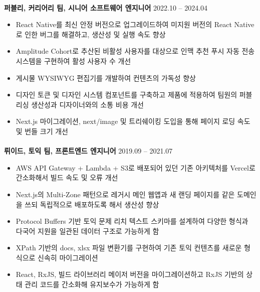 \documentclass{article}
\begin{document}
\paragraph{\newline \newline}
\textbf{퍼블리, 커리어리 팀, 시니어 소프트웨어 엔지니어} \hfill 2022.10 -- 2024.04
\begin{itemize}
    \setlength\itemsep{0.1em}
    \item React Native를 최신 안정 버전으로 업그레이드하여 미지원 버전의 React Native로 인한 버그를 해결하고, 생산성 및 실행 속도 향상
    \item Amplitude Cohort로 추산된 비활성 사용자를 대상으로 인맥 추천 푸시 자동 전송 시스템을 구현하여 활성 사용자 수 개선
    \item 게시물 WYSIWYG 편집기를 개발하여 컨텐츠의 가독성 향상
    \item 디자인 토큰 및 디자인 시스템 컴포넌트를 구축하고 제품에 적용하여 팀원의 퍼블리싱 생산성과 디자이너와의 소통 비용 개선
    \item Next.js 마이그레이션, next/image 및 트리쉐이킹 도입을 통해 페이지 로딩 속도 및 번들 크기 개선
\end{itemize}
\paragraph{}
\textbf{뤼이드, 토익 팀, 프론트엔드 엔지니어} \hfill 2019.09 -- 2021.07
\begin{itemize}
    \setlength\itemsep{0.1em}
    \item AWS API Gateway + Lambda + S3로 배포되어 있던 기존 아키텍처를 Vercel로 간소화해서 빌드 속도 및 오류 개선
    \item Next.js의 Multi-Zone 패턴으로 레거시 메인 웹앱과 새 랜딩 페이지를 같은 도메인을 쓰되 독립적으로 배포하도록 해서 생산성 향상
     \item Protocol Buffers 기반 토익 문제 리치 텍스트 스키마를 설계하여 다양한 형식과 다국어 지원을 일관된 데이터 구조로 가능하게 함
     \item XPath 기반의 docs, xlsx 파일 변환기를 구현하여 기존 토익 컨텐츠를 새로운 형식으로 신속히 마이그레이션
     \item React, RxJS, 빌드 라이브러리 메이저 버전을 마이그레이션하고 RxJS 기반의 상태 관리 코드를 간소화해 유지보수가 가능하게 함
\end{itemize}
\end{document}
